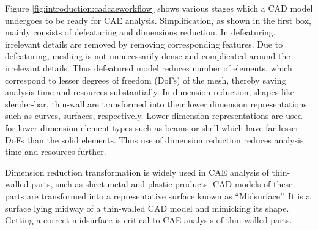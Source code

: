 Figure \ref{fig:introduction:cadcaeworkflow} shows various stages which a CAD model undergoes to be ready for CAE analysis. Simplification, as shown in the first box, mainly consists of defeaturing and dimensions reduction. In defeaturing, irrelevant details are removed by removing corresponding features. Due to defeaturing, meshing is not unnecessarily dense and complicated around the irrelevant details. Thus defeatured model reduces number of elements, which correspond to lesser degrees of freedom (DoFs) of the mesh, thereby saving analysis time and resources substantially.  In dimension-reduction, shapes like slender-bar, thin-wall are transformed into their lower dimension representations such as curves, surfaces, respectively. Lower dimension representations are used for lower dimension element types such as beams or shell which have far lesser DoFs than the solid elements. Thus use of dimension reduction reduces analysis time and resources further.

Dimension reduction transformation is widely used in CAE analysis of thin-walled parts, such as sheet metal and plastic products.  CAD models of these parts are transformed into a representative surface known as ``Midsurface''. It is a surface lying midway of a thin-walled CAD model and mimicking its shape.  Getting a correct midsurface is critical to CAE analysis of thin-walled parts.
%
	
